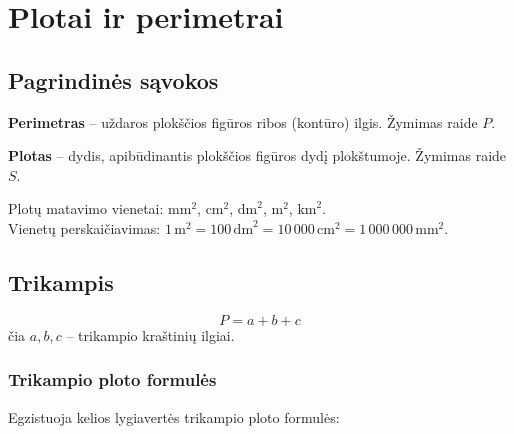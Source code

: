 \section{Plotai ir perimetrai}

\subsection{Pagrindinės sąvokos}

\begin{definition}
\textbf{Perimetras} – uždaros plokščios figūros ribos (kontūro) ilgis. Žymimas raide $P$.
\end{definition}

\begin{definition}
\textbf{Plotas} – dydis, apibūdinantis plokščios figūros dydį plokštumoje. Žymimas raide $S$.
\end{definition}

Plotų matavimo vienetai: $\text{mm}^2$, $\text{cm}^2$, $\text{dm}^2$, $\text{m}^2$, $\text{km}^2$. \\
Vienetų perskaičiavimas: $1\,\text{m}^2 = 100\,\text{dm}^2 = 10\,000\,\text{cm}^2 = 1\,000\,000\,\text{mm}^2$.

\subsection{Trikampis}

\begin{tcolorbox}[title={Trikampio perimetras}]
\[
P = a + b + c
\]
čia $a, b, c$ – trikampio kraštinių ilgiai.
\end{tcolorbox}

\subsubsection*{Trikampio ploto formulės}

Egzistuoja kelios lygiavertės trikampio ploto formulės:

